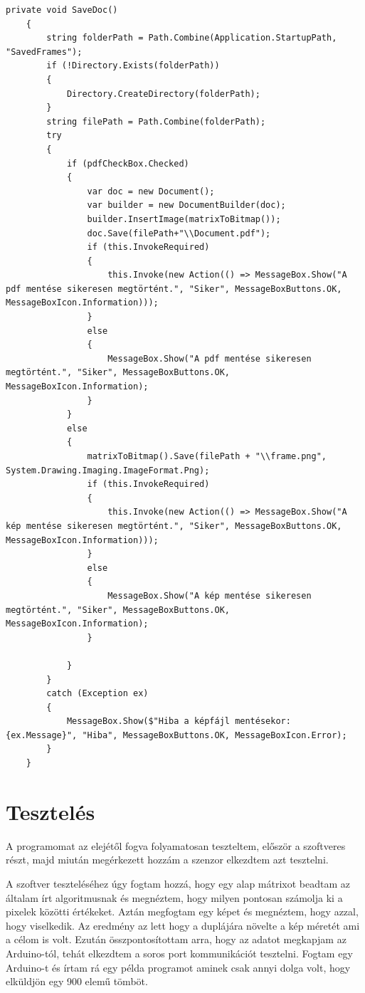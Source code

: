 \documentclass[]{thesis-ekf}
\theoremstyle{definition}
\theoremstyle{remark}
\begin{document}
\begin{lstlisting}[language=CSharp]
	private void SaveDoc()
	{
		string folderPath = Path.Combine(Application.StartupPath, "SavedFrames");
		if (!Directory.Exists(folderPath))
		{
			Directory.CreateDirectory(folderPath);
		}
		string filePath = Path.Combine(folderPath);
		try 
		{
			if (pdfCheckBox.Checked)
			{
				var doc = new Document();
				var builder = new DocumentBuilder(doc);
				builder.InsertImage(matrixToBitmap());
				doc.Save(filePath+"\\Document.pdf");
				if (this.InvokeRequired)
				{
					this.Invoke(new Action(() => MessageBox.Show("A pdf mentése sikeresen megtörtént.", "Siker", MessageBoxButtons.OK, MessageBoxIcon.Information)));
				}
				else
				{
					MessageBox.Show("A pdf mentése sikeresen megtörtént.", "Siker", MessageBoxButtons.OK, MessageBoxIcon.Information);
				}
			}
			else
			{
				matrixToBitmap().Save(filePath + "\\frame.png", System.Drawing.Imaging.ImageFormat.Png);
				if (this.InvokeRequired)
				{
					this.Invoke(new Action(() => MessageBox.Show("A kép mentése sikeresen megtörtént.", "Siker", MessageBoxButtons.OK, MessageBoxIcon.Information)));
				}
				else
				{
					MessageBox.Show("A kép mentése sikeresen megtörtént.", "Siker", MessageBoxButtons.OK, MessageBoxIcon.Information);
				}
				
			}
		}
		catch (Exception ex)
		{
			MessageBox.Show($"Hiba a képfájl mentésekor: {ex.Message}", "Hiba", MessageBoxButtons.OK, MessageBoxIcon.Error);
		}
	}
\end{lstlisting}
\chapter{Tesztelés}
A programomat az elejétől fogva folyamatosan teszteltem, először a szoftveres részt, majd miután megérkezett hozzám a szenzor elkezdtem azt tesztelni. 

A szoftver teszteléséhez úgy fogtam hozzá, hogy egy alap mátrixot beadtam az általam írt algoritmusnak és megnéztem, hogy milyen pontosan számolja ki a pixelek közötti értékeket. Aztán megfogtam egy képet és megnéztem, hogy azzal, hogy viselkedik. Az eredmény az lett hogy a duplájára növelte a kép méretét ami a célom is volt. Ezután összpontosítottam arra, hogy az adatot megkapjam az Arduino-tól, tehát elkezdtem a soros port kommunikációt tesztelni. Fogtam egy Arduino-t és írtam rá egy példa programot aminek csak annyi dolga volt, hogy elküldjön egy 900 elemű tömböt.
\end{document}
